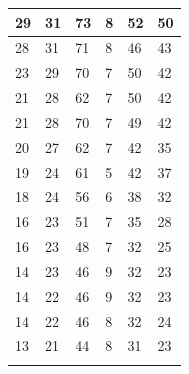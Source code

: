 \begin{table}
\begin{tabular}{p{2.5cm} p{2.5cm} p{2.5cm} p{2.5cm} p{2.5cm} p{2.5cm}}
\small{29} & \small{31}  & \small{73} & \small{8} & \small{52} & \small{50}\\ \hline 
\small{28} & \small{31}  & \small{71} & \small{8} & \small{46} & \small{43}\\ \hline 
\small{23} & \small{29}  & \small{70} & \small{7} & \small{50} & \small{42}\\ \hline 
\small{21} & \small{28}  & \small{62} & \small{7} & \small{50} & \small{42}\\ \hline 
\small{21} & \small{28}  & \small{70} & \small{7} & \small{49} & \small{42}\\ \hline 
\small{20} & \small{27}  & \small{62} & \small{7} & \small{42} & \small{35}\\ \hline 
\small{19} & \small{24}  & \small{61} & \small{5} & \small{42} & \small{37}\\ \hline 
\small{18} & \small{24}  & \small{56} & \small{6} & \small{38} & \small{32}\\ \hline 
\small{16} & \small{23}  & \small{51} & \small{7} & \small{35} & \small{28}\\ \hline 
\small{16} & \small{23}  & \small{48} & \small{7} & \small{32} & \small{25}\\ \hline 
\small{14} & \small{23}  & \small{46} & \small{9} & \small{32} & \small{23}\\ \hline 
\small{14} & \small{22}  & \small{46} & \small{9} & \small{32} & \small{23}\\ \hline 
\small{14} & \small{22}  & \small{46} & \small{8} & \small{32} & \small{24}\\ \hline 
\small{13} & \small{21}  & \small{44} & \small{8} & \small{31} & \small{23}\\ \hline  


\noalign{\smallskip}\hline
\end{tabular}
\end{table}









